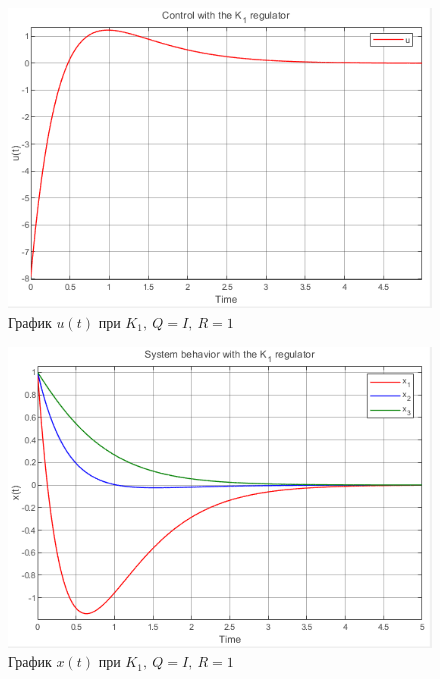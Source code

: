 \documentclass[a4paper, 12pt]{article}
\begin{document}
    \newpage
    \vspace*{0.01mm}
    \begin{figure}[H]
        \centering
        \includegraphics{3task_K1_u.png}
        \captionsetup{skip=0pt}
        \caption{График $u(t)$ при $K_1,\ Q=I,\ R=1$}
        \label{fig:3task_K1_u}
    \end{figure}
    \begin{figure}[H]
        \centering
        \includegraphics{3task_K1_x.png}
        \captionsetup{skip=0pt}
        \caption{График $x(t)$ при $K_{1},\ Q=I,\ R=1$}
        \label{fig:3task_K1_x}
    \end{figure}
    \newpage
    \vspace*{0.01mm}
\end{document}
